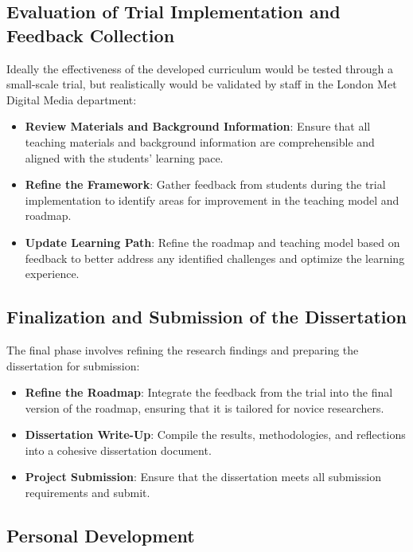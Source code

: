 \documentclass[11pt,a4paper]{article}
\begin{document}
\subsection{Evaluation of Trial Implementation and Feedback Collection}

Ideally the effectiveness of the developed curriculum would be tested through a small-scale trial, but realistically would be validated by staff in 
the London Met Digital Media department:

\begin{itemize}
	\item \textbf{Review Materials and Background Information}: Ensure that all teaching materials and background information are comprehensible 
		and aligned with the students' learning pace.
	\item \textbf{Refine the Framework}: Gather feedback from students during the trial implementation to identify areas for improvement in the 
		teaching model and roadmap.
	\item \textbf{Update Learning Path}: Refine the roadmap and teaching model based on feedback to better address any identified challenges 
		and optimize the learning experience.
\end{itemize}

\subsection{Finalization and Submission of the Dissertation}

The final phase involves refining the research findings and preparing the dissertation for submission:

\begin{itemize}
	\item \textbf{Refine the Roadmap}: Integrate the feedback from the trial into the final version of the roadmap, ensuring that it is 
		tailored for novice researchers.
	\item \textbf{Dissertation Write-Up}: Compile the results, methodologies, and reflections into a cohesive dissertation document.
	\item \textbf{Project Submission}: Ensure that the dissertation meets all submission requirements and submit.
\end{itemize}


\subsection{Personal Development}
\end{document}
